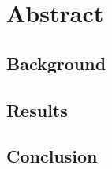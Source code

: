 \section {\Large Abstract}
    
    \subsection{\large Background}
    
    \subsection{\large Results}
    
    \subsection{\large Conclusion}
    

